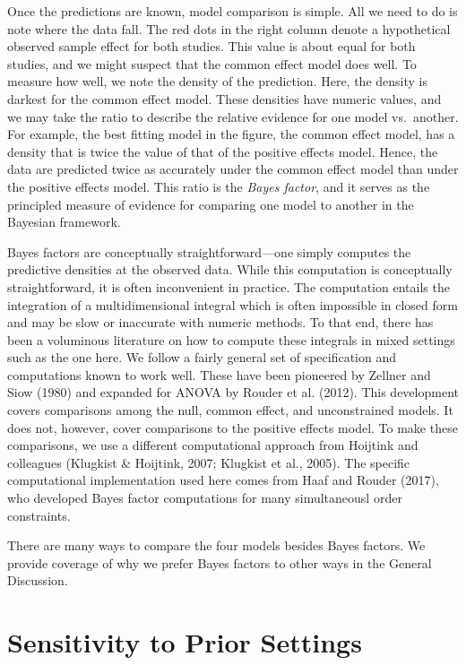 \documentclass[english,man]{apa6}
\theoremstyle{definition}
\theoremstyle{definition}
\theoremstyle{definition}
\theoremstyle{remark}
\begin{document}
Once the predictions are known, model comparison is simple. All we need
to do is note where the data fall. The red dots in the right column
denote a hypothetical observed sample effect for both studies. This
value is about equal for both studies, and we might suspect that the
common effect model does well. To measure how well, we note the density
of the prediction. Here, the density is darkest for the common effect
model. These densities have numeric values, and we may take the ratio to
describe the relative evidence for one model vs.~another. For example,
the best fitting model in the figure, the common effect model, has a
density that is twice the value of that of the positive effects model.
Hence, the data are predicted twice as accurately under the common
effect model than under the positive effects model. This ratio is the
\emph{Bayes factor}, and it serves as the principled measure of evidence
for comparing one model to another in the Bayesian framework.

Bayes factors are conceptually straightforward---one simply computes the
predictive densities at the observed data. While this computation is
conceptually straightforward, it is often inconvenient in practice. The
computation entails the integration of a multidimensional integral which
is often impossible in closed form and may be slow or inaccurate with
numeric methods. To that end, there has been a voluminous literature on
how to compute these integrals in mixed settings such as the one here.
We follow a fairly general set of specification and computations known
to work well. These have been pioneered by Zellner and Siow (1980) and
expanded for ANOVA by Rouder et al. (2012). This development covers
comparisons among the null, common effect, and unconstrained models. It
does not, however, cover comparisons to the positive effects model. To
make these comparisons, we use a different computational approach from
Hoijtink and colleagues (Klugkist \& Hoijtink, 2007; Klugkist et al.,
2005). The specific computational implementation used here comes from
Haaf and Rouder (2017), who developed Bayes factor computations for many
simultaneousl order constraints.

There are many ways to compare the four models besides Bayes factors. We
provide coverage of why we prefer Bayes factors to other ways in the
General Discussion.

\section{Sensitivity to Prior
Settings}\label{sensitivity-to-prior-settings}
\end{document}
